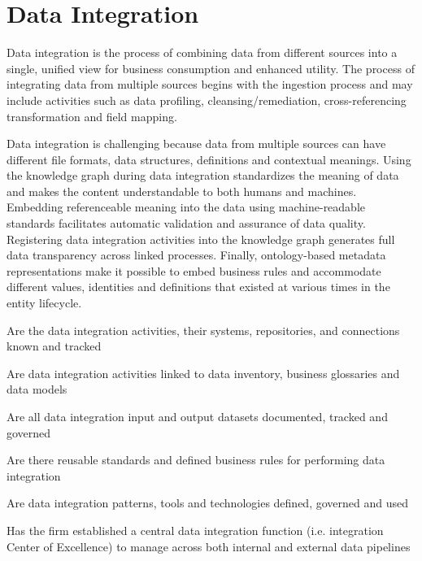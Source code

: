 \section{Data Integration}\label{sec:ekgmm-b-2-5} %

Data integration is the process of combining data from different sources into a single, unified view for
business consumption and enhanced utility.
The process of integrating data from multiple sources begins with the ingestion process and may include activities
such as data profiling, cleansing/remediation, cross-referencing transformation and field mapping.

\kgmmekgrationalesection

Data integration is challenging because data from multiple sources can have different file formats, data structures,
definitions and contextual meanings.
Using the knowledge graph during data integration standardizes the meaning of data and makes the content understandable
to both humans and machines.
Embedding referenceable meaning into the data using machine-readable standards facilitates automatic validation and
assurance of data quality.
Registering data integration activities into the knowledge graph generates full data transparency across
linked processes.
Finally, ontology-based metadata representations make it possible to embed business rules and accommodate
different values, identities and definitions that existed at various times in the entity lifecycle.

\kgmmcorequestionssection

\begin{core-questions}

  \item [\thesection.1] Are the data integration activities, their systems, repositories, and connections
                        known and tracked
  \item [\thesection.2] Are data integration activities linked to data inventory, business glossaries and data models
  \item [\thesection.3] Are all data integration input and output datasets documented, tracked and governed
  \item [\thesection.4] Are there reusable standards and defined business rules for performing data integration
  \item [\thesection.5] Are data integration patterns, tools and technologies defined, governed and used
  \item [\thesection.6] Has the firm established a central data integration function
                        (i.e. integration Center of Excellence) to manage  across both
                        internal and external data pipelines
\end{core-questions}

